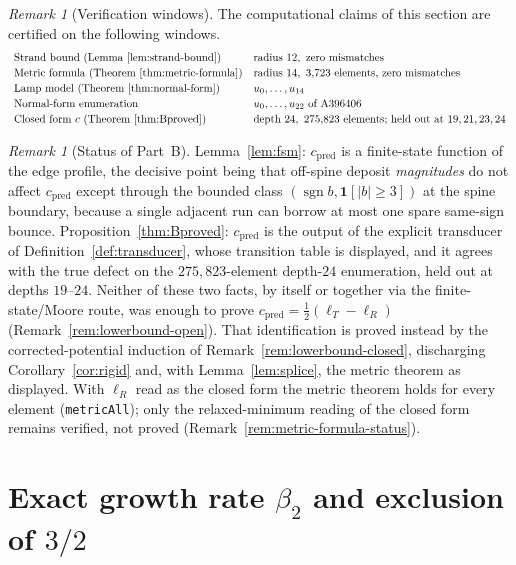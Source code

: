 \documentclass[11pt]{article}
\theoremstyle{plain}
\theoremstyle{definition}
\theoremstyle{remark}
\newtheorem{remark}[theorem]{Remark}
\begin{document}
\begin{remark}[Verification windows]
\label{rem:windows}
The computational claims of this section are certified on the following
windows.
\[
\begin{array}{ll}
\text{Strand bound (Lemma~\ref{lem:strand-bound})} & \text{radius }12,\ \text{zero mismatches}\\[2pt]
\text{Metric formula (Theorem~\ref{thm:metric-formula})} & \text{radius }14,\ 3{,}723\text{ elements, zero mismatches}\\[2pt]
\text{Lamp model (Theorem~\ref{thm:normal-form})} & u_0,\dots,u_{14}\\[2pt]
\text{Normal-form enumeration} & u_0,\dots,u_{22}\ \text{of A396406}\\[2pt]
\text{Closed form }c\ (\text{Theorem~\ref{thm:Bproved}}) & \text{depth }24,\ 275{,}823\text{ elements; held out at }19,21,23,24
\end{array}
\]
\end{remark}

\begin{remark}[Status of Part~B]
\label{rem:partB-status}
Lemma~\ref{lem:fsm}: $c_{\mathrm{pred}}$ is a finite-state function of the edge
profile, the decisive point being that off-spine deposit \emph{magnitudes} do
not affect $c_{\mathrm{pred}}$ except through the bounded class
$(\operatorname{sgn}b,\mathbf 1[|b|\ge3])$ at the spine boundary, because a
single adjacent run can borrow at most one spare same-sign bounce.
Proposition~\ref{thm:Bproved}: $c_{\mathrm{pred}}$ is the output of the
explicit transducer of Definition~\ref{def:transducer}, whose transition table
is displayed, and it agrees with the true defect on the $275{,}823$-element
depth-$24$ enumeration, held out at depths $19$--$24$. Neither of these two
facts, by itself or together via the finite-state/Moore route, was enough to
prove $c_{\mathrm{pred}}=\tfrac12(\ell_T-\ell_R)$ (Remark~\ref{rem:lowerbound-open}).
That identification is proved instead by the corrected-potential induction of
Remark~\ref{rem:lowerbound-closed}, discharging Corollary~\ref{cor:rigid} and,
with Lemma~\ref{lem:splice}, the metric theorem as displayed. With $\ell_R$
read as the closed form the metric theorem holds for every element
(\texttt{metricAll}); only the relaxed-minimum reading of the closed form
remains verified, not proved (Remark~\ref{rem:metric-formula-status}).
\end{remark}

\section{Exact growth rate \texorpdfstring{$\beta_2$}{beta2} and exclusion of \texorpdfstring{$3/2$}{3/2}}
\label{sec:beta2}
\end{document}
